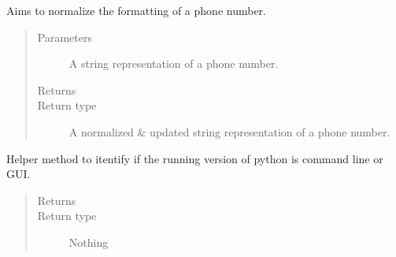 \documentclass[letterpaper,10pt,english]{sphinxmanual}
\begin{document}

\begin{fulllineitems}
\label{\detokenize{index:ListManagement.utility.general.clean_phone_number}}
Aims to normalize the formatting of a phone number.
\begin{quote}\begin{description}
\item[{Parameters}] \leavevmode
{} \textendash{} A string representation of a phone number.

\item[{Returns}] \leavevmode


\item[{Return type}] \leavevmode
A normalized \& updated string representation of a phone number.

\end{description}\end{quote}

\end{fulllineitems}


\begin{fulllineitems}
\label{\detokenize{index:ListManagement.utility.general.cmdorgui}}
Helper method to itentify if the running version of python is command line or GUI.
\begin{quote}\begin{description}
\item[{Returns}] \leavevmode


\item[{Return type}] \leavevmode
Nothing

\end{description}\end{quote}

\end{fulllineitems}

\end{document}
